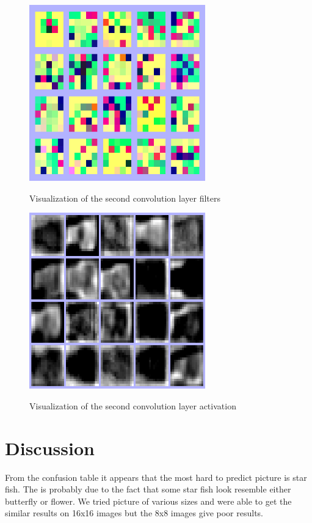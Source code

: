 \documentclass{article}
\begin{document}
\begin{figure}[!ht]
 \centering
  \includegraphics[width=3.0in]{epoch_46_l5_filters.png}
 \label{L1filters}
 \caption{Visualization of the second convolution layer filters}
\end{figure}


\begin{figure}[!ht]
 \centering
  \includegraphics[width=3.0in]{epoch_46_l5_activation.png}
 \label{L1Act}
 \caption{Visualization of the second convolution layer activation}
\end{figure}

\section{Discussion}
From the confusion table it appears that the most hard to predict picture is star fish. The is probably due to the fact that some star fish look resemble either butterfly or flower. We tried picture of various sizes and were able to get the similar results on 16x16 images but the 8x8 images give poor results. 
\end{document}
